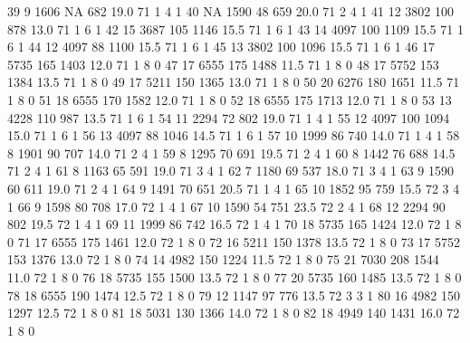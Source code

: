\documentclass{article}
\begin{document}
\begin{Schunk}
\begin{Soutput}
39        9  1606  NA  682 19.0  71      1       4        1
40       NA  1590  48  659 20.0  71      2       4        1
41       12  3802 100  878 13.0  71      1       6        1
42       15  3687 105 1146 15.5  71      1       6        1
43       14  4097 100 1109 15.5  71      1       6        1
44       12  4097  88 1100 15.5  71      1       6        1
45       13  3802 100 1096 15.5  71      1       6        1
46       17  5735 165 1403 12.0  71      1       8        0
47       17  6555 175 1488 11.5  71      1       8        0
48       17  5752 153 1384 13.5  71      1       8        0
49       17  5211 150 1365 13.0  71      1       8        0
50       20  6276 180 1651 11.5  71      1       8        0
51       18  6555 170 1582 12.0  71      1       8        0
52       18  6555 175 1713 12.0  71      1       8        0
53       13  4228 110  987 13.5  71      1       6        1
54       11  2294  72  802 19.0  71      1       4        1
55       12  4097 100 1094 15.0  71      1       6        1
56       13  4097  88 1046 14.5  71      1       6        1
57       10  1999  86  740 14.0  71      1       4        1
58        8  1901  90  707 14.0  71      2       4        1
59        8  1295  70  691 19.5  71      2       4        1
60        8  1442  76  688 14.5  71      2       4        1
61        8  1163  65  591 19.0  71      3       4        1
62        7  1180  69  537 18.0  71      3       4        1
63        9  1590  60  611 19.0  71      2       4        1
64        9  1491  70  651 20.5  71      1       4        1
65       10  1852  95  759 15.5  72      3       4        1
66        9  1598  80  708 17.0  72      1       4        1
67       10  1590  54  751 23.5  72      2       4        1
68       12  2294  90  802 19.5  72      1       4        1
69       11  1999  86  742 16.5  72      1       4        1
70       18  5735 165 1424 12.0  72      1       8        0
71       17  6555 175 1461 12.0  72      1       8        0
72       16  5211 150 1378 13.5  72      1       8        0
73       17  5752 153 1376 13.0  72      1       8        0
74       14  4982 150 1224 11.5  72      1       8        0
75       21  7030 208 1544 11.0  72      1       8        0
76       18  5735 155 1500 13.5  72      1       8        0
77       20  5735 160 1485 13.5  72      1       8        0
78       18  6555 190 1474 12.5  72      1       8        0
79       12  1147  97  776 13.5  72      3       3        1
80       16  4982 150 1297 12.5  72      1       8        0
81       18  5031 130 1366 14.0  72      1       8        0
82       18  4949 140 1431 16.0  72      1       8        0

\end{Soutput}
\end{Schunk}
\end{document}
